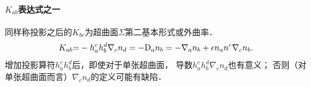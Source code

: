 



\paragraph{$K_{ab}$表达式之一}
同样称投影之后的$K_{bc}$为超曲面$\Sigma$第二基本形式或外曲率．
\begin{equation}\label{chsm:eqn_Kab-1}
    K_{ab} {=} -h_a^c h_b^d \nabla_{c} {n}_d =- {\rm D}_a n_b
     = -\nabla_{a} n_b + \epsilon n_a n^c \nabla_{c} n_b .
\end{equation}
增加投影算符$h_a^c h_b^d$后，即使对于单张超曲面，
导数$h_a^c h_b^d \nabla_{c} {n}_d$也有意义；
否则（对单张超曲面而言）$\nabla_{c} {n}_d$的定义可能有缺陷．



